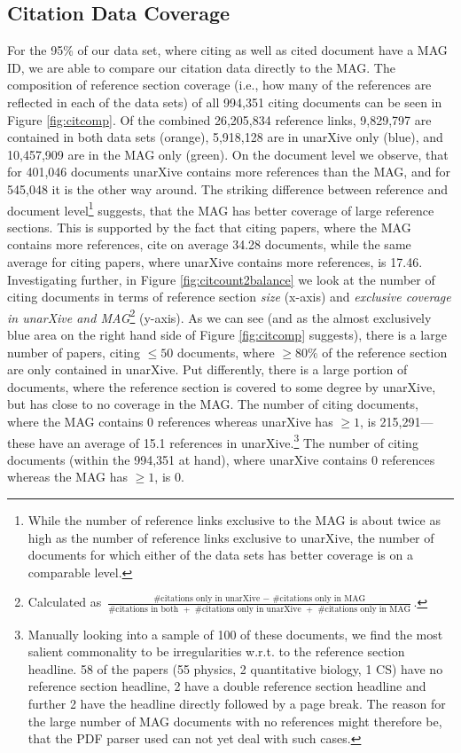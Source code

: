 \subsection{Citation Data Coverage}
For the 95\% of our data set, where citing as well as cited document have a MAG ID, we are able to compare our citation data directly to the MAG. The composition of reference section coverage (i.e., how many of the references are reflected in each of the data sets) of all 994,351 citing documents can be seen in Figure \ref{fig:citcomp}.  Of the combined 26,205,834 reference links, 9,829,797 are contained in both data sets (orange), 5,918,128 are in unarXive only (blue), and 10,457,909 are in the MAG only (green). On the document level we observe, that for 401,046 documents unarXive contains more references than the MAG, and for 545,048 it is the other way around. The striking difference between reference and document level\footnote{While the number of reference links exclusive to the MAG is about twice as high as the number of reference links exclusive to unarXive, the number of documents for which either of the data sets has better coverage is on a comparable level.} suggests, that the MAG has better coverage of large reference sections. This is supported by the fact that citing papers, where the MAG contains more references, cite on average 34.28 documents, while the same average for citing papers, where unarXive contains more references, is 17.46. Investigating further, in Figure \ref{fig:citcount2balance} we look at the number of citing documents in terms of reference section \emph{size} (x-axis) and \emph{exclusive coverage in unarXive and MAG}\footnote{Calculated as $\frac{\text{\#citations only in unarXive }-\text{ \#citations only in MAG}}{\text{\#citations in both }+\text{ \#citations only in unarXive }+\text{ \#citations only in MAG}}$.} (y-axis). As we can see (and as the almost exclusively blue area on the right hand side of Figure \ref{fig:citcomp} suggests), there is a large number of papers, citing $\leq 50$ documents, where $\geq 80\%$ of the reference section are only contained in unarXive. Put differently, there is a large portion of documents, where the reference section is covered to some degree by unarXive, but has close to no coverage in the MAG. The number of citing documents, where the MAG contains $0$ references whereas unarXive has $\ge 1$, is 215,291---these have an average of 15.1 references in unarXive.\footnote{Manually looking into a sample of 100 of these documents, we find the most salient commonality to be irregularities w.r.t. to the reference section headline. 58 of the papers (55 physics, 2 quantitative biology, 1 CS) have no reference section headline, 2 have a double reference section headline and further 2 have the headline directly followed by a page break. The reason for the large number of MAG documents with no references might therefore be, that the PDF parser used can not yet deal with such cases.} The number of citing documents (within the 994,351 at hand), where unarXive contains $0$ references whereas the MAG has $\ge 1$, is 0.

